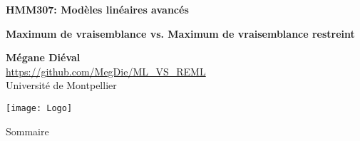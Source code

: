 \documentclass[unknownkeysallowed]{beamer}
\begin{document}



\begin{frame}
\bigskip
\bigskip
\begin{center}{
\LARGE\color{marron}
\textbf{HMM307: Modèles linéaires avancés}
\textbf{ }\\
\vspace{0.5cm}
}

\color{marron}
\textbf{Maximum de vraisemblance vs. Maximum de vraisemblance restreint}
\end{center}

\vspace{0.5cm}

\begin{center}
\textbf{Mégane Diéval} \\
\vspace{0.1cm}
\url{https://github.com/MegDie/ML_VS_REML}\\
\vspace{0.5cm}
Université de Montpellier \\
\end{center}

\centering
\texttt{[image: Logo]}

\end{frame}






\begin{frame}{Sommaire}
\tableofcontents[hideallsubsections]
\end{frame}



\end{document}
